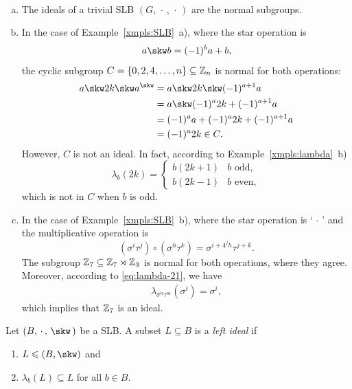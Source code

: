 \begin{xmpls}${}$
    \begin{enumerate}[a),font=\upshape]
        \item The ideals of a trivial SLB $(G,\,\cdot\,,\,\cdot\,)$ are the normal subgroups.

        \item In the case of Example~\ref{xmpls:SLB}~a), where the star operation is
        $$
            a\skw b = (-1)^ba+b,
        $$
        the cyclic subgroup $C=\{0,2,4,\dots,n\}\subseteq\mathbb{Z}_n$ is normal for both operations:
        \begin{align*}
            a\skw2k\skw a^\skw
                &= a\skw2k\skw(-1)^{a+1}a\\
                &= a\skw(-1)^a2k+(-1)^{a+1}a\\
                &= (-1)^aa+(-1)^a2k+(-1)^{a+1}a\\
                &=(-1)^a2k\in C.
        \end{align*}
        However, $C$ is not an ideal. In fact, according to Example~\ref{xmpls:lambda}~b)
        $$
            \lambda_b(2k) = \begin{cases}
                b(2k+1)     &\text{$b$ odd},\\
                b(2k-1)     &\text{$b$ even},
            \end{cases}
        $$
        which is not in $C$ when $b$ is odd.

        \item In the case of Example~\ref{xmpls:SLB}~b), where the star operation is `$\,\cdot\,$' and the multiplicative operation is
        $$
            (\sigma^i\tau^j)\circ(\sigma^h\tau^k)
                = \sigma^{i+4^jh}\tau^{j+k}.
        $$
        The subgroup $\mathbb{Z}_7\subseteq\mathbb{Z}_7\rtimes\mathbb{Z}_3$ is normal for both operations, where they agree. Moreover, according to \eqref{eq:lambda-21}, we have
        \begin{align*}
            \lambda_{\sigma^n\tau^m}(\sigma^i)=\sigma^i,
        \end{align*}
        which implies that $\mathbb{Z}_7$ is an ideal.
    \end{enumerate}
\end{xmpls}

\begin{defn}
    Let $(B,\,\cdot\,,\,\skw\,)$ be a SLB. A subset $L\subseteq B$ is a \textsl{left ideal\/} if
    \begin{enumerate}[-]
        \item $L\subgroup(B,\skw)$ and
        \item $\lambda_b(L)\subseteq L$ for all $b\in B$.
    \end{enumerate}
\end{defn}

